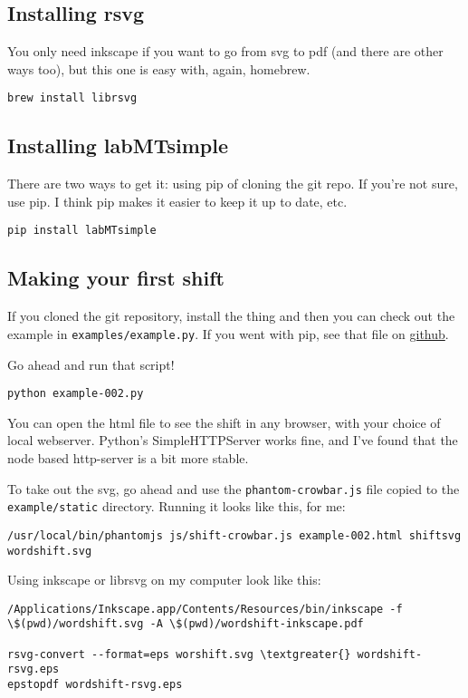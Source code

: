 \subsection{Installing rsvg}
\label{wordshifts:installing-rsvg}
You only need inkscape if you want to go from svg to pdf (and there are other ways too), but this one is easy with, again, homebrew.
\begin{lstlisting}
brew install librsvg
\end{lstlisting}


\subsection{Installing labMTsimple}
\label{wordshifts:installing-labmtsimple}
There are two ways to get it: using pip of cloning the git repo.
If you're not sure, use pip.
I think pip makes it easier to keep it up to date, etc.
\begin{lstlisting}
pip install labMTsimple
\end{lstlisting}


\subsection{Making your first shift}
\label{wordshifts:making-your-first-shift}
If you cloned the git repository, install the thing and then you can check out the example in \lstinline{examples/example.py}.
If you went with pip, see that file on \href{https://github.com/andyreagan/labMT-simple/blob/master/examples/example.py}{github}.

Go ahead and run that script!
\begin{lstlisting}
python example-002.py
\end{lstlisting}

You can open the html file to see the shift in any browser, with your choice of local webserver.
Python's SimpleHTTPServer works fine, and I've found that the node based http-server is a bit more stable.

To take out the svg, go ahead and use the \lstinline{phantom-crowbar.js} file copied to the \lstinline{example/static} directory.
Running it looks like this, for me:
\begin{lstlisting}
/usr/local/bin/phantomjs js/shift-crowbar.js example-002.html shiftsvg wordshift.svg
\end{lstlisting}

Using inkscape or librsvg on my computer look like this:
\begin{lstlisting}
/Applications/Inkscape.app/Contents/Resources/bin/inkscape -f \$(pwd)/wordshift.svg -A \$(pwd)/wordshift-inkscape.pdf

rsvg-convert --format=eps worshift.svg \textgreater{} wordshift-rsvg.eps
epstopdf wordshift-rsvg.eps
\end{lstlisting}


